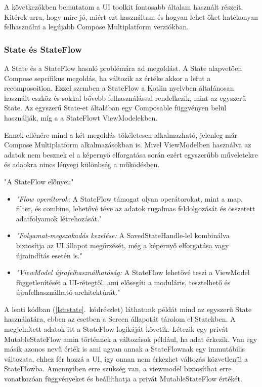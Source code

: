 A következőkben bemutatom a UI toolkit fontosabb általam használt részeit.
Kitérek arra, hogy mire jó, miért ezt használtam és hogyan lehet őket hatékonyan felhasználni a legújabb Compose Multiplatform verziókban.

\subsubsection{State és StateFlow}
\label{sec:State}

A State és a StateFlow hasnló problémára ad megoldást.
A State alapvetően Compose sepcifikus megoldás, ha változik az értéke akkor a lefut a recomposoition.
Ezzel szemben a StateFlow a Kotlin nyelvben általánosan használt eszköz és sokkal bővebb felhasználással rendelkezik, mint az egyszerű State.
Az egyszerű State-et általában egy Composable függvényen belül használják, míg a a StateFlowt ViewModelekben.

Ennek ellénére mind a két megoldás tökéletesen alkalmazható, jelenleg már Compose Multiplatform alkalmazásokban is.
Mivel ViewModelben használva az adatok nem besznek el a képernyő elforgatása során ezért egyszerűbb műveletekre és adaokra nincs lényegi különbség a működésben. 

"A StateFlow előnyei:"\cite{StateVsStateFlow}
\begin{itemize}
    \item \emph{"Flow operátorok:} A StateFlow támogat olyan operátorokat, mint a map, filter, és combine, lehetővé téve az adatok rugalmas feldolgozását és összetett adatfolyamok létrehozását."
    \item \emph{"Folyamat-megszakadás kezelése:} A SavedStateHandle-lel kombinálva biztosítja az UI állapot megőrzését, még a képernyő elforgatása vagy újraindítás esetén is."
    \item \emph{"ViewModel újrafelhasználhatóság:} A StateFlow lehetővé teszi a ViewModel függetlenítését a UI-rétegtől, ami elősegíti a moduláris, tesztelhető és újrafelhasználható architektúrát."
\end{itemize}

A lenti kódban (\ref{lst:state}.~kódrészlet) láthatunk példát mind az egyszerű State használatára, ebben az esetben a Screen állapotát tárolom el Statekben.
A megjelnített adatok itt a StateFlow logikáját követik. 
Létezik egy privát MutableStateFlow amin történnek a változások például, ha adat érkezik.
Van egy másik azonos nevű érték is ami ugyan annak a StateFlownak egy immutábilis változata, ehhez fér hozzá a UI, így onnan nem érkezhet változás közvetlenül a StateFlowba.
Amennyiben erre szükség van, a viewmodel biztosíthat erre vonatkozóan függvényeket és beállíthatja a privát MutableStateFlow értékét.

